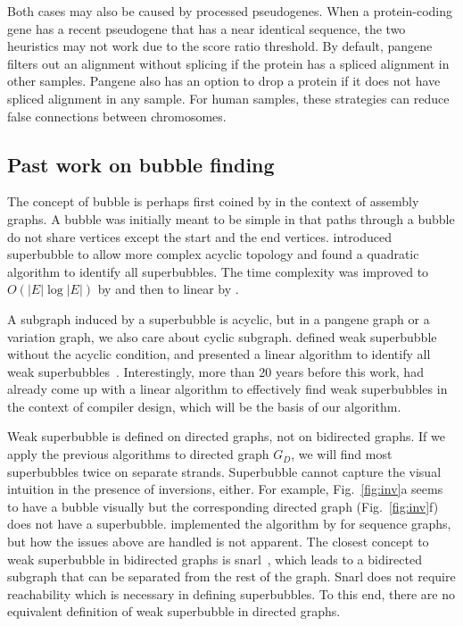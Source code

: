 \documentclass[webpdf,contemporary,large,namedate]{oup-authoring-template}%
\begin{document}
Both cases may also be caused by processed pseudogenes.
When a protein-coding gene has a recent pseudogene that has a near identical sequence,
the two heuristics may not work due to the score ratio threshold.
By default, pangene filters out an alignment without splicing if the protein has a spliced alignment in other samples.
Pangene also has an option to drop a protein if it does not have spliced alignment in any sample.
For human samples, these strategies can reduce false connections between chromosomes.

\subsection{Past work on bubble finding}

The concept of bubble is perhaps first coined by \citet{Zerbino:2008uq} in the context of assembly graphs.
A bubble was initially meant to be simple in that paths through a bubble do not share vertices except the start and the end vertices.
\citet{DBLP:conf/wabi/OnoderaSS13} introduced superbubble to allow more complex acyclic topology
and found a quadratic algorithm to identify all superbubbles.
The time complexity was improved to $O(|E|\log|E|)$ by \citet{Sung:2015aa}
and then to linear by \citet{DBLP:journals/tcs/BrankovicIKMPV16}.

A subgraph induced by a superbubble is acyclic, but in a pangene graph or a variation graph,
we also care about cyclic subgraph.
\citet{Gartner:2018aa} defined weak superbubble without the acyclic condition,
and presented a linear algorithm to identify all weak superbubbles~\citep{DBLP:journals/algorithms/GartnerS19}.
Interestingly, more than 20 years before this work,
\citet{DBLP:conf/pldi/JohnsonPP94} had already come up with a linear algorithm to effectively find weak superbubbles in the context of compiler design,
which will be the basis of our algorithm.

Weak superbubble is defined on directed graphs, not on bidirected graphs.
If we apply the previous algorithms to directed graph $G_D$,
we will find most superbubbles twice on separate strands.
Superbubble cannot capture the visual intuition in the presence of inversions, either.
For example, Fig.~\ref{fig:inv}a seems to have a bubble visually
but the corresponding directed graph (Fig.~\ref{fig:inv}f) does not have a superbubble.
\citet{Dabbaghie:2022aa} implemented the algorithm by \citet{DBLP:conf/wabi/OnoderaSS13} for sequence graphs,
but how the issues above are handled is not apparent.
The closest concept to weak superbubble in bidirected graphs is snarl~\citep{Paten:2018aa},
which leads to a bidirected subgraph that can be separated from the rest of the graph.
Snarl does not require reachability which is necessary in defining superbubbles.
To this end, there are no equivalent definition of weak superbubble in directed graphs.
\end{document}
